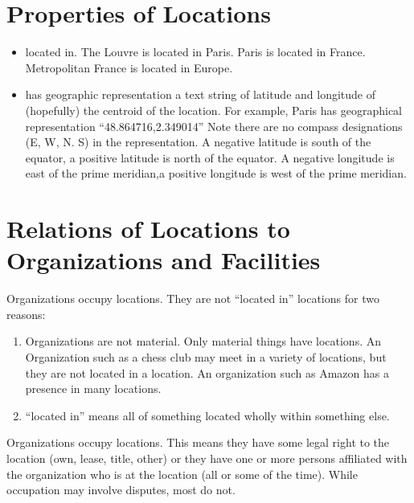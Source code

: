 \documentclass[letterpaper,10pt,english]{sphinxmanual}
\begin{document}
\section{Properties of Locations}
\label{\detokenize{locations:properties-of-locations}}\begin{itemize}
\item {} 
\sphinxAtStartPar
located in.  The Louvre is located in Paris.  Paris is located in France.  Metropolitan
France is located in Europe.

\item {} 
\sphinxAtStartPar
has geographic representation \textendash{} a text string of latitude and longitude of (hopefully)
the centroid of the location.  For example, Paris has geographical representation
“48.864716,2.349014”  Note there are no compass designations (E, W, N. S) in the
representation. A negative latitude is south of the equator, a positive latitude is
north of the equator.  A negative longitude is east of the prime meridian,a positive
longitude is west of the prime meridian.

\end{itemize}


\section{Relations of Locations to Organizations and Facilities}
\label{\detokenize{locations:relations-of-locations-to-organizations-and-facilities}}
\sphinxAtStartPar
Organizations occupy locations.  They are not “located in” locations for two reasons:
\begin{enumerate}
%
\item {} 
\sphinxAtStartPar
Organizations are not material.  Only material things have locations.  An Organization
such as a chess club may meet in a variety of locations, but they are not located
in a location.  An organization such as Amazon has a presence in many locations.

\item {} 
\sphinxAtStartPar
“located in” means all of something located wholly within something else.

\end{enumerate}

\sphinxAtStartPar
Organizations occupy locations.  This means they have some legal right to the location
(own, lease, title, other) or they have one or more persons affiliated with the
organization who is at the location (all or some of the time). While
occupation may involve disputes, most do not.
\end{document}
